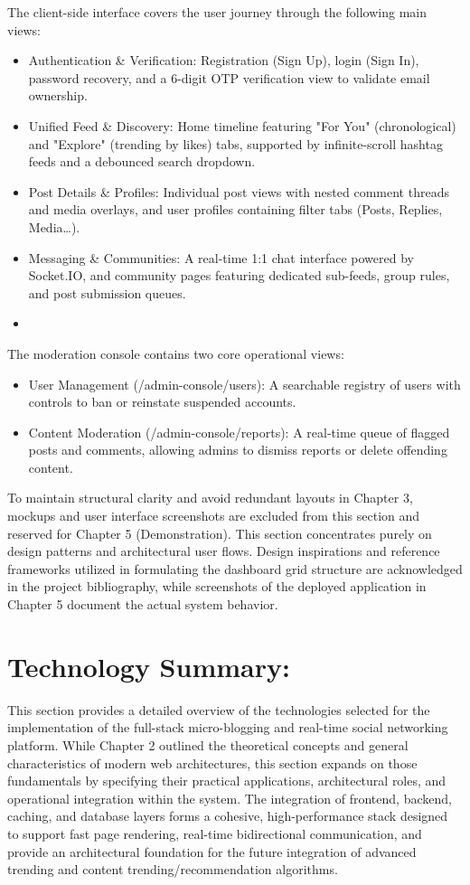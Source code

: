 The client-side interface covers the user journey through the following main views:
\begin{itemize}
  \item Authentication \& Verification: Registration (Sign Up), login (Sign In), password recovery, and a 6-digit OTP verification view to validate email ownership.
  \item Unified Feed \& Discovery: Home timeline featuring "For You" (chronological) and "Explore" (trending by likes) tabs, supported by infinite-scroll hashtag feeds and a debounced search dropdown.
  \item Post Details \& Profiles: Individual post views with nested comment threads and media overlays, and user profiles containing filter tabs (Posts, Replies, Media{\ldots}).
  \item Messaging \& Communities: A real-time 1:1 chat interface powered by Socket.IO, and community pages featuring dedicated sub-feeds, group rules, and post submission queues.
  \item 
\end{itemize}

The moderation console contains two core operational views:
\begin{itemize}
  \item User Management (/admin-console/users): A searchable registry of users with controls to ban or reinstate suspended accounts.
  \item Content Moderation (/admin-console/reports): A real-time queue of flagged posts and comments, allowing admins to dismiss reports or delete offending content.
\end{itemize}

To maintain structural clarity and avoid redundant layouts in Chapter 3, mockups and user interface screenshots are excluded from this section and reserved for Chapter 5 (Demonstration). This section concentrates purely on design patterns and architectural user flows. Design inspirations and reference frameworks utilized in formulating the dashboard grid structure are acknowledged in the project bibliography, while screenshots of the deployed application in Chapter 5 document the actual system behavior.

\section{Technology Summary:}

This section provides a detailed overview of the technologies selected for the implementation of the full-stack micro-blogging and real-time social networking platform. While Chapter 2 outlined the theoretical concepts and general characteristics of modern web architectures, this section expands on those fundamentals by specifying their practical applications, architectural roles, and operational integration within the system. The integration of frontend, backend, caching, and database layers forms a cohesive, high-performance stack designed to support fast page rendering, real-time bidirectional communication, and provide an architectural foundation for the future integration of advanced trending and content trending/recommendation algorithms.


